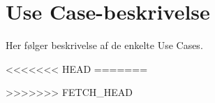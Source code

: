 \section{Use Case-beskrivelse}

Her følger beskrivelse af de enkelte Use Cases.



<<<<<<< HEAD
%
=======


%
>>>>>>> FETCH_HEAD

